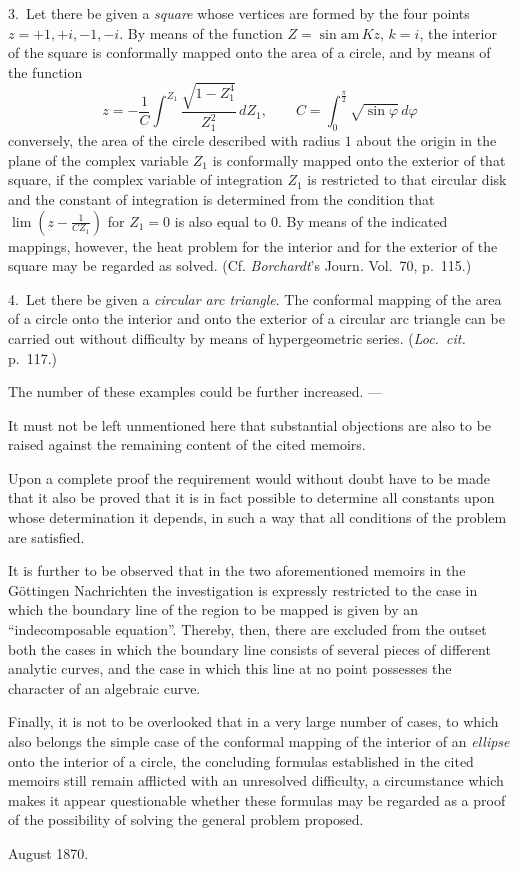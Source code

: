 \documentclass{article}
\begin{document}
3.~Let there be given a \emph{square} whose vertices
are formed by the four points $z = +1, +i, -1, -i$. By means of the function $Z = \sin\mathrm{am}\, Kz$, $k = i$, the interior of the square is conformally mapped onto the area of a circle, and by means of the function
\[
z = -\frac{1}{C} \int^{Z_1} \frac{\sqrt{1 - Z_1^4}}{Z_1^2} \, dZ_1, \qquad C = \int_0^{\frac{\pi}{2}} \sqrt{\sin\varphi} \, d\varphi
\]
conversely, the area of the circle described with radius $1$ about the origin in the plane of the complex variable $Z_1$ is conformally mapped onto the exterior of that square, if the complex variable of integration $Z_1$ is restricted to that circular disk and the constant of integration is determined from the condition that $\lim \left(z - \frac{1}{CZ_1}\right)$ for $Z_1 = 0$ is also equal to $0$. By means of the indicated mappings, however, the heat problem for the interior and for the exterior of the square may be regarded as solved. (Cf. \emph{Borchardt}'s Journ. Vol.~70, p.~115.)

4.~Let there be given a \emph{circular arc triangle}. The conformal mapping of the area of a circle onto the interior and onto the exterior of a circular arc triangle can be carried out without difficulty by means of hypergeometric series. (\emph{Loc.~cit.} p.~117.)

The number of these examples could be further increased. ---

It must not be left unmentioned here that substantial objections are also to be raised against the remaining content of the cited memoirs.

Upon a complete proof the requirement would without doubt have to be made that it also
be proved that it is in fact possible to determine all constants upon whose determination it depends, in such a way that all conditions of the problem are satisfied.

It is further to be observed that in the two aforementioned memoirs in the Göttingen Nachrichten the investigation is expressly restricted to the case in which the boundary line of the region to be mapped is given by an ``indecomposable equation''. Thereby, then, there are excluded from the outset both the cases in which the boundary line consists of several pieces of different analytic curves, and the case in which this line at no point possesses the character of an algebraic curve.

Finally, it is not to be overlooked that in a very large number of cases, to which also belongs the simple case of the conformal mapping of the interior of an \emph{ellipse} onto the interior of a circle, the concluding formulas established in the cited memoirs still remain afflicted with an unresolved difficulty, a circumstance which makes it appear questionable whether these formulas may be regarded as a proof of the possibility of solving the general problem proposed.

August 1870.
\end{document}
